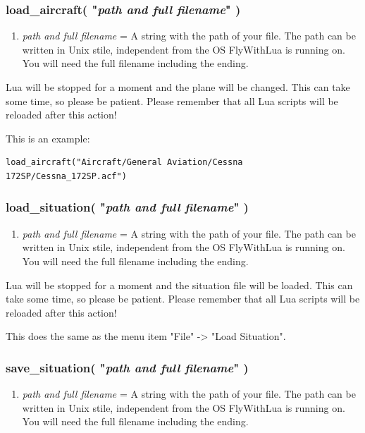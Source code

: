 \documentclass[11pt,parskip=half,a4paper]{scrartcl}
\begin{document}
\subsubsection{load\_aircraft( "\emph{path and full filename}" )}

\begin{enumerate}
	\item \emph{path and full filename} = A string with the path of your file. The path can be written in Unix stile, independent from the OS FlyWithLua is running on. You will need the full filename including the ending.
\end{enumerate}

Lua will be stopped for a moment and the plane will be changed. This can take some time, so please be patient. Please remember that all Lua scripts will be reloaded after this action!

This is an example:
\begin{lstlisting}
load_aircraft("Aircraft/General Aviation/Cessna 172SP/Cessna_172SP.acf")
\end{lstlisting}

\subsubsection{load\_situation( "\emph{path and full filename}" )}

\begin{enumerate}
	\item \emph{path and full filename} = A string with the path of your file. The path can be written in Unix stile, independent from the OS FlyWithLua is running on. You will need the full filename including the ending.
\end{enumerate}

Lua will be stopped for a moment and the situation file will be loaded. This can take some time, so please be patient. Please remember that all Lua scripts will be reloaded after this action!

This does the same as the menu item "File" -> "Load Situation".

\subsubsection{save\_situation( "\emph{path and full filename}" )}

\begin{enumerate}
	\item \emph{path and full filename} = A string with the path of your file. The path can be written in Unix stile, independent from the OS FlyWithLua is running on. You will need the full filename including the ending.
\end{enumerate}
\end{document}
